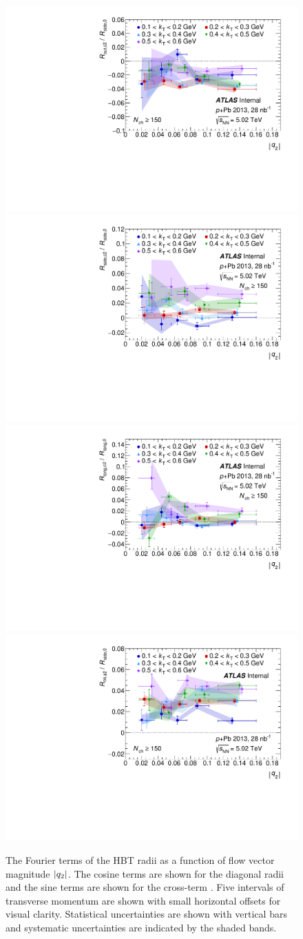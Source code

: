\begin{figure}[t]
\centering
\includegraphics[width=.49\linewidth]{can_u_Rout_vs_q2.pdf}
\includegraphics[width=.49\linewidth]{can_u_Rside_vs_q2.pdf}\\
\includegraphics[width=.49\linewidth]{can_u_Rlong_vs_q2.pdf}
\includegraphics[width=.49\linewidth]{can_w_Ros_vs_q2.pdf}\\
\caption{The Fourier terms of the HBT radii as a function of flow vector magnitude $|q_{2}|$. The cosine terms are shown for the diagonal radii and the sine terms are shown for the cross-term \Ros. Five intervals of transverse momentum \kt are shown with small horizontal offsets for visual clarity. Statistical uncertainties are shown with vertical bars and systematic uncertainties are indicated by the shaded bands.}
\label{fig:Rosl_vs_q2}
\end{figure}

